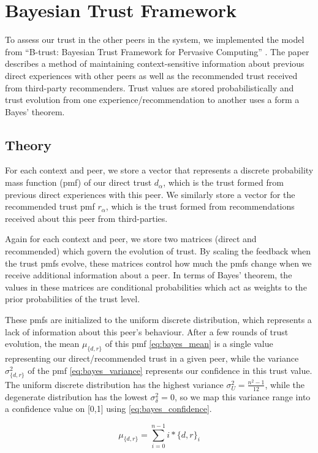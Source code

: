\section{Bayesian Trust Framework}
To assess our trust in the other peers in the system, we implemented
the model from ``B-trust: Bayesian Trust Framework for Pervasive Computing''
\cite{btrust}. The paper describes a method of maintaining context-sensitive
information about previous direct experiences with other peers as well as
the recommended trust received from third-party recommenders. Trust values
are stored probabilistically and trust evolution from one
experience/recommendation to another uses a form a Bayes' theorem.


\subsection{Theory}
For each context and peer, we store a vector that represents a discrete
probability mass function (pmf) of our direct trust $d_\alpha$, which is the
trust formed from previous direct experiences with this peer. We similarly store a
vector for the recommended trust pmf $r_\alpha$, which is the trust formed from
recommendations received about this peer from third-parties.

Again for each context and peer, we store two matrices (direct and recommended)
which govern the evolution of trust. By scaling the feedback when the trust
pmfs evolve, these matrices control how much the pmfs change when we receive
additional information about a peer. In terms of Bayes' theorem, the
values in these matrices are conditional probabilities which act as weights
to the prior probabilities of the trust level.

These pmfs are initialized to the uniform discrete distribution, which
represents a lack of information about this peer's behaviour. After a few rounds
of trust evolution, the mean $\mu_{\{d,r\}}$ of this pmf \eqref{eq:bayes_mean}
is a single value representing our direct/recommended trust in a given peer,
while the variance $\sigma^2_{\{d,r\}}$ of the pmf \eqref{eq:bayes_variance}
represents our confidence in this trust value. The uniform discrete distribution
has the highest variance $\sigma^2_U = \frac{n^2-1}{12}$, while the degenerate
distribution has the lowest $\sigma^2_\delta = 0$, so we map this variance range
into a confidence value on [0,1] using \eqref{eq:bayes_confidence}.

\begin{equation}
\label{eq:bayes_mean}
\mu_{\{d,r\}} = \sum_{i=0}^{n-1}{i*{\{d,r\}}_i}
\end{equation}

